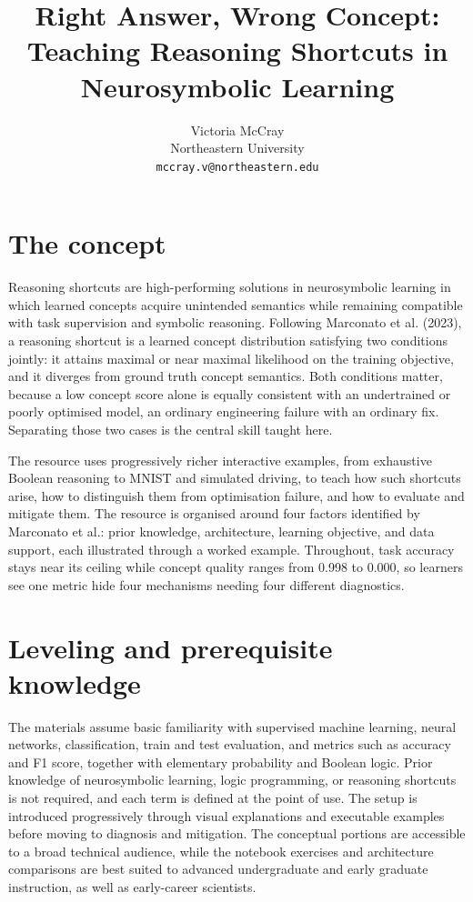 \documentclass{article}
\title{Right Answer, Wrong Concept:\\Teaching Reasoning Shortcuts in Neurosymbolic Learning}
\author{%
  Victoria McCray\\
  Northeastern University\\
  \texttt{mccray.v@northeastern.edu}
}
\begin{document}
\maketitle

\section{The concept}

Reasoning shortcuts are high-performing solutions in neurosymbolic learning in
which learned concepts acquire unintended semantics while remaining compatible
with task supervision and symbolic reasoning. Following Marconato et al.
(2023), a reasoning shortcut is a learned concept distribution satisfying two
conditions jointly: it attains maximal or near maximal likelihood on the
training objective, and it diverges from ground truth concept semantics. Both
conditions matter, because a low concept score alone is equally consistent with
an undertrained or poorly optimised model, an ordinary engineering failure with
an ordinary fix. Separating those two cases is the central skill taught here.

The resource uses progressively richer interactive examples, from exhaustive
Boolean reasoning to MNIST and simulated driving, to teach how such shortcuts
arise, how to distinguish them from optimisation failure, and how to evaluate
and mitigate them. The resource is organised around four factors identified by
Marconato et al.: prior knowledge, architecture, learning objective, and data
support, each illustrated through a worked example. Throughout, task accuracy
stays near its ceiling while concept quality ranges from 0.998 to 0.000, so
learners see one metric hide four mechanisms needing four different diagnostics.

\section{Leveling and prerequisite knowledge}

The materials assume basic familiarity with supervised machine learning, neural
networks, classification, train and test evaluation, and metrics such as
accuracy and F1 score, together with elementary probability and Boolean logic.
Prior knowledge of neurosymbolic learning, logic programming, or reasoning
shortcuts is not required, and each term is defined at the point of use. The
setup is introduced progressively through visual explanations and executable
examples before moving to diagnosis and mitigation. The conceptual portions are
accessible to a broad technical audience, while the notebook exercises and
architecture comparisons are best suited to advanced undergraduate and early
graduate instruction, as well as early-career scientists.
\end{document}
